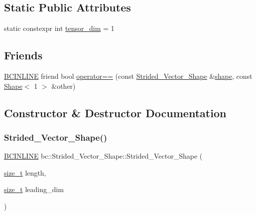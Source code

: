 \subsection*{Static Public Attributes}
\begin{DoxyCompactItemize}
\item 
static constexpr int \hyperlink{structbc_1_1Strided__Vector__Shape_a28edcbb59d225b1e8fa7176d2412cddf}{tensor\+\_\+dim} = 1
\end{DoxyCompactItemize}
\subsection*{Friends}
\begin{DoxyCompactItemize}
\item 
\hyperlink{common_8h_a6699e8b0449da5c0fafb878e59c1d4b1}{B\+C\+I\+N\+L\+I\+NE} friend bool \hyperlink{structbc_1_1Strided__Vector__Shape_abb938e2873e050dd5acc35a80a37c1e9}{operator==} (const \hyperlink{structbc_1_1Strided__Vector__Shape}{Strided\+\_\+\+Vector\+\_\+\+Shape} \&\hyperlink{namespacebc_a1bc6dec532973ac024c738c0fd32cca3}{shape}, const \hyperlink{structbc_1_1Shape}{Shape}$<$ 1 $>$ \&other)
\end{DoxyCompactItemize}


\subsection{Constructor \& Destructor Documentation}
\mbox{\label{structbc_1_1Strided__Vector__Shape_a84a2a4bed5a6303eb63332e2223702a0}} 
\subsubsection{\texorpdfstring{Strided\+\_\+\+Vector\+\_\+\+Shape()}{Strided\_Vector\_Shape()}}
{\footnotesize\ttfamily \hyperlink{common_8h_a6699e8b0449da5c0fafb878e59c1d4b1}{B\+C\+I\+N\+L\+I\+NE} bc\+::\+Strided\+\_\+\+Vector\+\_\+\+Shape\+::\+Strided\+\_\+\+Vector\+\_\+\+Shape (\begin{DoxyParamCaption}\item[{\hyperlink{namespacebc_aaf8e3fbf99b04b1b57c4f80c6f55d3c5}{size\+\_\+t}}]{length,  }\item[{\hyperlink{namespacebc_aaf8e3fbf99b04b1b57c4f80c6f55d3c5}{size\+\_\+t}}]{leading\+\_\+dim }\end{DoxyParamCaption})\hspace{0.3cm}{\ttfamily [inline]}}



